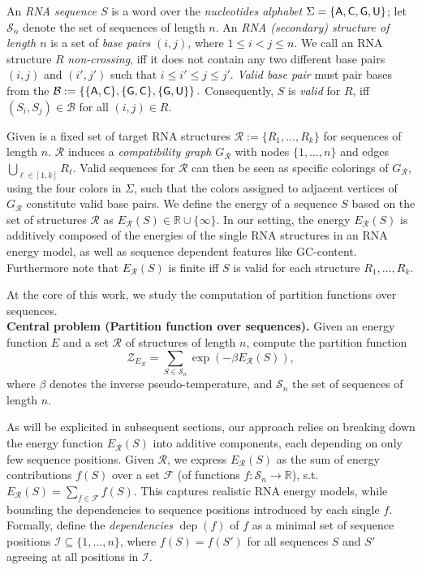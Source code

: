 \documentclass{bioinfo}
\newcommand{\dep}{\operatorname{dep}}
\newcommand{\partfun}[1]{\mathcal{Z}_{#1}}
\newcommand{\real}{\mathbb{R}}
\newcommand{\B}{\mathcal{B}}
\newcommand{\F}{\mathcal{F}}
\newcommand{\I}{\mathcal{I}}
\newcommand{\R}{\mathcal{R}}
\renewcommand{\S}{\mathcal{S}}
\newcommand{\Def}[1]{{\it #1}}
\newcommand{\TODO}[1]{\textcolor{red!70!black}{\textbf{TODO: #1}}}
\newcommand{\Nuc}[1]{{\sf #1}}
\newcommand{\Ab}{\Nuc{A}}
\newcommand{\Cb}{\Nuc{C}}
\newcommand{\Gb}{\Nuc{G}}
\newcommand{\Ub}{\Nuc{U}}
\newcommand{\GCb}{\Gb\Cb}
\begin{document}
An \Def{RNA sequence $S$} is a word over the \Def{nucleotides
  alphabet} $\Sigma=\{\Ab,\Cb,\Gb,\Ub\}$; let $\S_n$ denote the set of
sequences of length $n$. An \Def{RNA (secondary) structure of length
  $n$} is a set of \Def{base pairs} $(i,j)$, where $1\leq i<j\leq
n$. We call an RNA structure $R$ \Def{non-crossing}, iff it does not
contain any two different base pairs $(i,j)$ and $(i',j')$ such that
$i\leq i'\leq j \leq j'.$ \Def{Valid base pair} must pair bases from
the $\B:=\left\{\{\Ab,\Cb\},\{\Gb,\Cb\},\{\Gb,\Ub\}\right\}.$
Consequently, $S$ is \Def{valid} for $R$, iff
$(S_i,S_j)\in \B$ for all $(i,j)\in R$.
%

Given is a fixed set of target RNA structures
$\R:=\{R_1, \dots, R_k\}$ for sequences of length $n$. $\R$ induces a
\Def{compatibility graph}
$G_{\R}$ with nodes $\{1,\dots,n\}$ and edges $\bigcup_{\ell\in[1,k]} R_\ell$. Valid
sequences for $\R$ can then be seen as specific colorings of $G_{\R}$,
using the four colors in $\Sigma$, such that the colors assigned to
adjacent vertices of $G_{\R}$ constitute valid base pairs.
%
We define the energy of a sequence $S$ based on the set of structures
$\R$ as $E_\R(S) \in \mathbb{R}\cup\{\infty\}$. In
our setting, the energy $E_\R(S)$ is additively composed of
the energies of the single RNA structures in an RNA energy model, as
well as sequence dependent features like \GCb-content.  Furthermore note
that $E_\R(S)$ is finite iff $S$ is valid for each structure
$R_1,\dots,R_k$.

At the core of this work, we study the computation of partition
functions over sequences.\smallskip\\
\textbf{Central problem (Partition function over sequences).}
  Given an energy function $E$ and a set $\R$ of structures of length $n$, compute the
  partition function
  \begin{equation}
    \label{eq:mainproblem}
    \partfun{E_\R} = \sum_{S\in\S_n} \exp(-\beta E_\R(S)),
  \end{equation}
  where $\beta$ denotes the inverse pseudo-temperature, and $\S_n$ the set of sequences of length $n$.

%
As will be explicited in subsequent sections, our approach relies on breaking down the energy function $E_\R(S)$ into additive components, each depending on only few sequence positions. Given $\R$, we express $E_\R(S)$
as the sum of energy contributions $f(S)$ over a set $\F$ (of
functions $f:\S_n\to\real$), s.t.~$E_\R(S)=\sum_{f\in\F} f(S)$. This
captures realistic RNA energy models, while bounding the
dependencies to sequence positions introduced by each single $f$. Formally, define the \Def{dependencies} $\dep(f)$ of $f$ as a minimal set of sequence positions $\I\subseteq\{1,\dots,n\}$, where $f(S)=f(S')$ for all sequences $S$ and $S'$ agreeing at all positions in $\I$.
\end{document}
